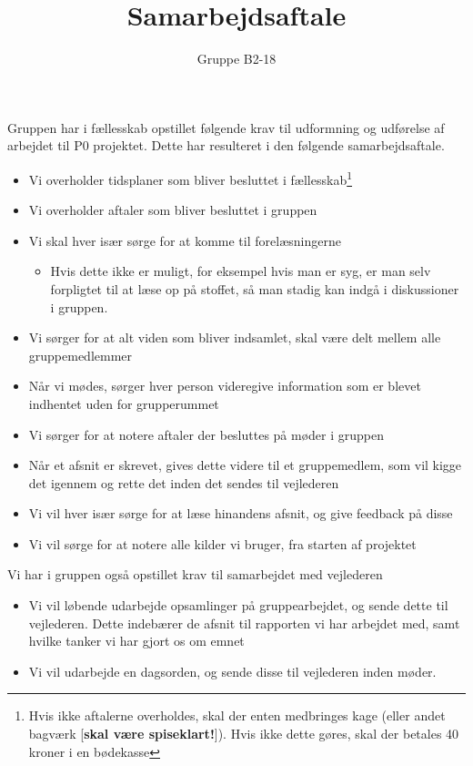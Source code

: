 \documentclass[hidelinks, 12pt]{article}
\makeatletter
\newcommand\footnoteref[1]{\protected@xdef\@thefnmark{\ref{#1}}\@footnotemark}
\makeatother
\begin{document}
	\title{Samarbejdsaftale}
	\author{Gruppe B2-18}
	\maketitle
	Gruppen har i fællesskab opstillet følgende krav til udformning og udførelse af arbejdet til P0 projektet. Dette har resulteret i den følgende samarbejdsaftale.
	
	\begin{itemize}
		\item Vi overholder tidsplaner som bliver besluttet i fællesskab\footnote{\label{note1}Hvis ikke aftalerne overholdes, skal der enten medbringes kage (eller andet bagværk [\textbf{skal være spiseklart!}]). Hvis ikke dette gøres, skal der betales 40 kroner i en bødekasse}
		\item Vi overholder aftaler som bliver besluttet i gruppen\footnoteref{note1}
		\item Vi skal hver især sørge for at komme til forelæsningerne
		\begin{itemize}
			\item Hvis dette ikke er muligt, for eksempel hvis man er syg, er man selv forpligtet til at læse op på stoffet, så man stadig kan indgå i diskussioner i gruppen. 
		\end{itemize}
		\item Vi sørger for at alt viden som bliver indsamlet, skal være delt mellem alle gruppemedlemmer
		\item Når vi mødes, sørger hver person videregive information som er blevet indhentet uden for grupperummet
		\item Vi sørger for at notere aftaler der besluttes på møder i gruppen
		\item Når et afsnit er skrevet, gives dette videre til et gruppemedlem, som vil kigge det igennem og rette det inden det sendes til vejlederen\footnoteref{note1}
		\item Vi vil hver især sørge for at læse hinandens afsnit, og give feedback på disse\footnoteref{note1}
		\item Vi vil sørge for at notere alle kilder vi bruger, fra starten af projektet\footnoteref{note1}
	\end{itemize}

	Vi har i gruppen også opstillet krav til samarbejdet med vejlederen

	\begin{itemize}
		\item Vi vil løbende udarbejde opsamlinger på gruppearbejdet, og sende dette til vejlederen. Dette indebærer de afsnit til rapporten vi har arbejdet med, samt hvilke tanker vi har gjort os om emnet
		\item Vi vil udarbejde en dagsorden, og sende disse til vejlederen inden møder.
	\end{itemize}
\end{document}
